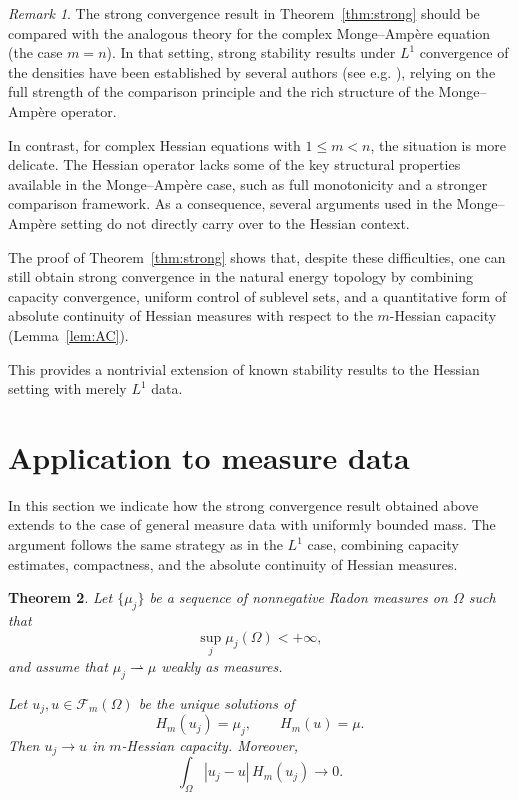 \documentclass[11pt,reqno]{amsart}
\newtheorem{theorem}{Theorem}[section]
\theoremstyle{definition}
\theoremstyle{remark}
\newtheorem{remark}[theorem]{Remark}
\begin{document}
\begin{remark}
	The strong convergence result in Theorem~\ref{thm:strong} should be compared 
	with the analogous theory for the complex Monge--Amp\`ere equation (the case $m=n$). 
	In that setting, strong stability results under $L^1$ convergence of the densities 
	have been established by several authors (see e.g. \cite{DinewPlis, Liu-Zhang}), 
	relying on the full strength of the comparison principle and the rich structure 
	of the Monge--Amp\`ere operator.
	
	In contrast, for complex Hessian equations with $1 \le m < n$, the situation is 
	more delicate. The Hessian operator lacks some of the key structural properties 
	available in the Monge--Amp\`ere case, such as full monotonicity and a stronger 
	comparison framework. As a consequence, several arguments used in the 
	Monge--Amp\`ere setting do not directly carry over to the Hessian context.
	
	The proof of Theorem~\ref{thm:strong} shows that, despite these difficulties, 
	one can still obtain strong convergence in the natural energy topology 
	by combining capacity convergence, uniform control of sublevel sets, 
	and a quantitative form of absolute continuity of Hessian measures 
	with respect to the $m$-Hessian capacity (Lemma~\ref{lem:AC}).
	
	This provides a nontrivial extension of known stability results to the 
	Hessian setting with merely $L^1$ data.
\end{remark}
\section{Application to measure data}

In this section we indicate how the strong convergence result obtained above
extends to the case of general measure data with uniformly bounded mass.
The argument follows the same strategy as in the $L^1$ case, combining
capacity estimates, compactness, and the absolute continuity of Hessian measures.

\medskip

\begin{theorem}\label{thm:measure_stability}
	Let $\{\mu_j\}$ be a sequence of nonnegative Radon measures on $\Omega$
	such that
	\[
	\sup_j \mu_j(\Omega) < +\infty,
	\]
	and assume that $\mu_j \rightharpoonup \mu$ weakly as measures.
	
	Let $u_j, u \in \mathcal{F}_m(\Omega)$ be the unique solutions of
	\[
	H_m(u_j) = \mu_j,
	\qquad
	H_m(u) = \mu.
	\]
	Then $u_j \to u$ in $m$-Hessian capacity. Moreover,
	\[
	\int_\Omega |u_j - u| \, H_m(u_j) \longrightarrow 0.
	\]
\end{theorem}
\end{document}
